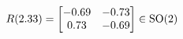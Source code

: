 \documentclass[preview]{standalone}
\begin{document}
\begin{align*}
\special{dvisvgm:raw <g id='unique000'>}R(2.33) = \begin{bmatrix} -0.69 & -0.73 \\ 0.73 & -0.69 \end{bmatrix} \in \text{SO}(2)\special{dvisvgm:raw </g>}
\end{align*}
\end{document}
